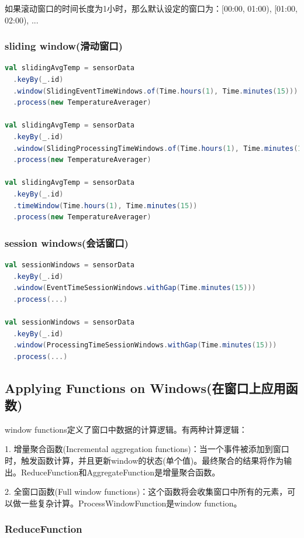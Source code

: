 \documentclass[oneside]{ctexbook}
\begin{document}
如果滚动窗口的时间长度为1小时，那么默认设定的窗口为：[00:00, 01:00), [01:00, 02:00), ...

\subsubsection{sliding window(滑动窗口)}

\begin{lstlisting}[language=scala]
val slidingAvgTemp = sensorData
  .keyBy(_.id)
  .window(SlidingEventTimeWindows.of(Time.hours(1), Time.minutes(15)))
  .process(new TemperatureAverager)

val slidingAvgTemp = sensorData
  .keyBy(_.id)
  .window(SlidingProcessingTimeWindows.of(Time.hours(1), Time.minutes(15)))
  .process(new TemperatureAverager)

val slidingAvgTemp = sensorData
  .keyBy(_.id)
  .timeWindow(Time.hours(1), Time.minutes(15))
  .process(new TemperatureAverager)
\end{lstlisting}

\subsubsection{session windows(会话窗口)}

\begin{lstlisting}[language=scala]
val sessionWindows = sensorData
  .keyBy(_.id)
  .window(EventTimeSessionWindows.withGap(Time.minutes(15)))
  .process(...)

val sessionWindows = sensorData
  .keyBy(_.id)
  .window(ProcessingTimeSessionWindows.withGap(Time.minutes(15)))
  .process(...)
\end{lstlisting}

\subsection{Applying Functions on Windows(在窗口上应用函数)}

window functions定义了窗口中数据的计算逻辑。有两种计算逻辑：

1. 增量聚合函数(Incremental aggregation functions)：当一个事件被添加到窗口时，触发函数计算，并且更新window的状态(单个值)。最终聚合的结果将作为输出。ReduceFunction和AggregateFunction是增量聚合函数。

2. 全窗口函数(Full window functions)：这个函数将会收集窗口中所有的元素，可以做一些复杂计算。ProcessWindowFunction是window function。

\subsubsection{ReduceFunction}
\end{document}
